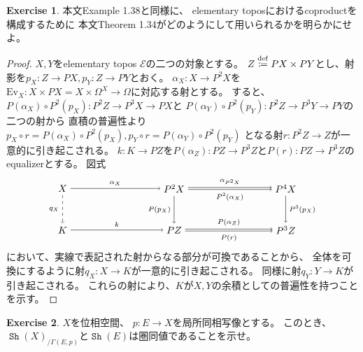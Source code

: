 \documentclass[uplatex]{jsarticle}
\theoremstyle{definition}
\newtheorem{prob}[prob]{Exercise}
\def\mcE{\mathcal{E}}
\newcommand{\dfn}{\overset{\mathrm{\tiny def}}{\coloneqq}}
\DeclareMathOperator{\Sh}{\mathtt{Sh}}
\begin{document}
\begin{prob}\label{prob: 1.6}
  本文Example 1.38と同様に、
  elementary toposにおけるcoproductを構成するために
  本文Theorem 1.34がどのようにして用いられるかを明らかにせよ。
\end{prob}

\begin{proof}
  \(X,Y\)をelementary topos \(\mcE\)の二つの対象とする。
  \(Z\dfn PX \times PY\)とし、射影を\(p_X:Z\to PX, p_Y:Z\to PY\)とおく。
  \(\alpha_X:X\to P^2X\)を
  \(\mathrm{Ev}_X:X\times PX = X\times \Omega^X \to \Omega\)に対応する射とする。
  すると、
  \(P(\alpha_X) \circ P^2(p_X): P^2Z\to P^3X \to PX\)と
  \(P(\alpha_Y) \circ P^2(p_Y): P^2Z\to P^3Y \to PY\)の二つの射から
  直積の普遍性より
  \(p_X\circ r = P(\alpha_X) \circ P^2(p_X), p_Y\circ r = P(\alpha_Y) \circ P^2(p_Y)\)
  となる射\(r:P^2Z \to Z\)が一意的に引き起こされる。
  \(k:K\to PZ\)を\(P(\alpha_Z): PZ \to P^3Z\)と\(P(r):PZ\to P^3Z\)のequalizerとする。
  図式
  \[
  \begin{tikzpicture}[auto]
    \node (A) at (0,1.5) {\(X\)};
    \node (B) at (4,1.5) {\(P^2X\)};
    \node (C) at (8,1.5) {\(P^4X\)};
    \node (A') at (0,0) {\(K\)};
    \node (B') at (4,0) {\(PZ\)};
    \node (C') at (8,0) {\(P^3Z\)};
    \draw[->,transform canvas={yshift=1pt}] (B) to node {\(\scriptstyle \alpha_{P^2X}\)} (C);
    \draw[->,transform canvas={yshift=-1pt}] (B) to node[swap] {\(\scriptstyle P^2(\alpha_X)\)} (C);
    \draw[->] (A) to node {\(\scriptstyle \alpha_X\)} (B);
    \draw[->,transform canvas={yshift=1pt}] (B') to node {\(\scriptstyle P(\alpha_Z)\)} (C');
    \draw[->,transform canvas={yshift=-1pt}] (B') to node[swap] {\(\scriptstyle P(r)\)} (C');
    \draw[->] (A') to node {\(\scriptstyle k\)} (B');
    \draw[->, dashed] (A) to node[swap] {\(\scriptstyle q_X\)} (A');
    \draw[->] (B) to node[swap] {\(\scriptstyle P(p_X)\)} (B');
    \draw[->] (C) to node {\(\scriptstyle P^3(p_X)\)} (C');
  \end{tikzpicture}
  \]
  において、実線で表記された射からなる部分が可換であることから、
  全体を可換にするように射\(q_X: X\to K\)が一意的に引き起こされる。
  同様に射\(q_Y: Y\to K\)が引き起こされる。
  これらの射により、\(K\)が\(X,Y\)の余積としての普遍性を持つことを示す。
\end{proof}







\begin{prob}\label{prob: 1.7}
  \(X\)を位相空間、
  \(p:E\to X\)を局所同相写像とする。
  このとき、\(\Sh(X)_{/\Gamma(E,p)}\)と\(\Sh(E)\)は圏同値であることを示せ。
\end{prob}
\end{document}

